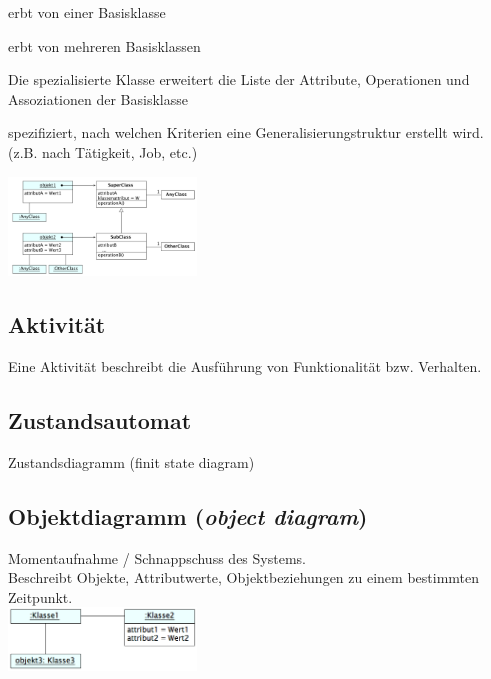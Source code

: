   \begin{description}
  	\parbox{9cm}{
    \item[Einfachvererbung]
      erbt von einer Basisklasse
    \item[Mehrfachvererbung]
      erbt von mehreren Basisklassen
    \item[Generalisierung] 
      Die spezialisierte Klasse erweitert die Liste der
      Attribute, Operationen und Assoziationen der Basisklasse
    \item[Generalisierungsmenge] 
      spezifiziert, nach welchen Kriterien eine Generalisierungstruktur erstellt wird.
      (z.B. nach Tätigkeit, Job, etc.)}
  \parbox{8cm}{
  	\includegraphics[width=5cm]{./bilder/Mechanismus_Vererbung}
  }
  \end{description}

 \begin{multicols}{2}
	\subsection{Aktivität }
  		Eine Aktivität beschreibt die Ausführung von Funktionalität bzw. Verhalten.

	\subsection{Zustandsautomat }
 		 Zustandsdiagramm (finit state diagram)
 \end{multicols}
 
\subsection{Objektdiagramm (\textit{object diagram})}
	\begin{multicols}{2}
		Momentaufnahme / Schnappschuss des Systems. \\
		Beschreibt Objekte, Attributwerte, Objektbeziehungen zu einem bestimmten Zeitpunkt. \\
	\columnbreak
		\includegraphics[width=5cm]{./bilder/objektdiagramm}
	\end{multicols}



